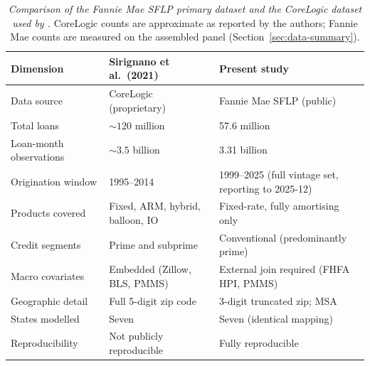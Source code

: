 \begin{table}[htbp]
  \centering
  \small
  \begin{tabularx}{\textwidth}{@{} l X X @{}}
    \toprule
    \textbf{Dimension}
      & \textbf{Sirignano et al.\ (2021)}
      & \textbf{Present study} \\
    \midrule
    Data source
      & CoreLogic (proprietary)
      & Fannie Mae SFLP (public) \\[3pt]
    Total loans
      & ${\sim}120$ million
      & 57.6 million \\[3pt]
    Loan-month observations
      & ${\sim}3.5$ billion
      & 3.31 billion \\[3pt]
    Origination window
      & 1995--2014
      & 1999--2025 (full vintage set, reporting to 2025-12) \\[3pt]
    Products covered
      & Fixed, ARM, hybrid, balloon, IO
      & Fixed-rate, fully amortising only \\[3pt]
    Credit segments
      & Prime and subprime
      & Conventional (predominantly prime) \\[3pt]
    Macro covariates
      & Embedded (Zillow, BLS, PMMS)
      & External join required (FHFA HPI, PMMS) \\[3pt]
    Geographic detail
      & Full 5-digit zip code
      & 3-digit truncated zip; MSA \\[3pt]
    States modelled
      & Seven
      & Seven (identical mapping) \\[3pt]
    Reproducibility
      & Not publicly reproducible
      & Fully reproducible \\
    \bottomrule
  \end{tabularx}
  \caption[Comparison of the Fannie Mae SFLP dataset and the
  CoreLogic dataset used by Sirignano et al.\ (2021)]%
  {\textit{Comparison of the Fannie Mae SFLP primary dataset and the
  CoreLogic dataset used by \citet{sirignano2021}.}  CoreLogic counts
  are approximate as reported by the authors; Fannie Mae counts are
  measured on the assembled panel (Section~\ref{sec:data-summary}).}
  \label{tab:data-comparison}
\end{table}
